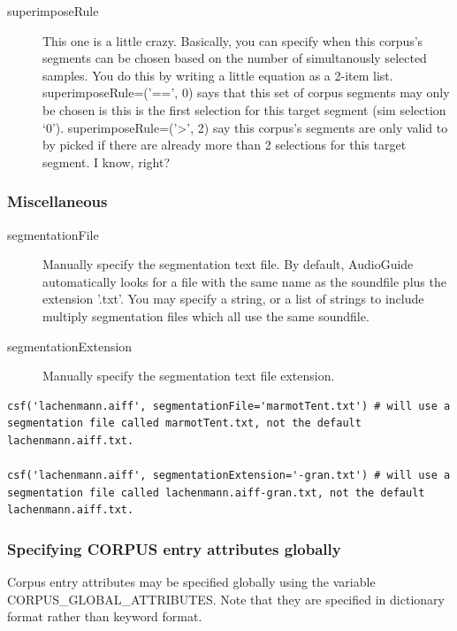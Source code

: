 \documentclass{article}
\begin{document}
\begin{spacing}{1.2}
\begin{description}

\item[superimposeRule]  This one is a little crazy.  Basically, you can specify when this corpus's segments can be chosen based on the number of simultanously selected samples.  You do this by writing a little equation as a 2-item list.  superimposeRule=('==', 0) says that this set of corpus segments may only be chosen is this is the first selection for this target segment (sim selection `0').  superimposeRule=('>', 2) say this corpus's segments are only valid to by picked if there are already more than 2 selections for this target segment.  I know, right?
\end{description}


\subsubsection{Miscellaneous}
\begin{description}
\item[segmentationFile] Manually specify the segmentation text file. By default, AudioGuide automatically looks for a file with the same name as the soundfile plus the extension '.txt'. You may specify a string, or a list of strings to include multiply segmentation files which all use the same soundfile.

\item[segmentationExtension] Manually specify the segmentation text file extension.
\end{description}

\begin{lstlisting}
csf('lachenmann.aiff', segmentationFile='marmotTent.txt') # will use a segmentation file called marmotTent.txt, not the default lachenmann.aiff.txt.

csf('lachenmann.aiff', segmentationExtension='-gran.txt') # will use a segmentation file called lachenmann.aiff-gran.txt, not the default lachenmann.aiff.txt.
\end{lstlisting}


\subsubsection{Specifying CORPUS entry attributes globally}
Corpus entry attributes may be specified globally using the variable CORPUS\_GLOBAL\_ATTRIBUTES.  Note that they are specified in dictionary format rather than keyword format.


\end{spacing}
\end{document}
